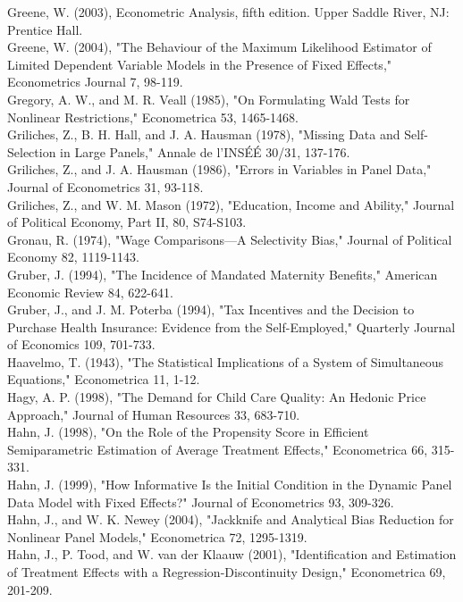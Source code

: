 \documentclass[10pt]{article}
\begin{document}
Greene, W. (2003), Econometric Analysis, fifth edition. Upper Saddle River, NJ: Prentice Hall.\\
Greene, W. (2004), "The Behaviour of the Maximum Likelihood Estimator of Limited Dependent Variable Models in the Presence of Fixed Effects," Econometrics Journal 7, 98-119.\\
Gregory, A. W., and M. R. Veall (1985), "On Formulating Wald Tests for Nonlinear Restrictions," Econometrica 53, 1465-1468.\\
Griliches, Z., B. H. Hall, and J. A. Hausman (1978), "Missing Data and Self-Selection in Large Panels," Annale de l'INSÉÉ 30/31, 137-176.\\
Griliches, Z., and J. A. Hausman (1986), "Errors in Variables in Panel Data," Journal of Econometrics 31, 93-118.\\
Griliches, Z., and W. M. Mason (1972), "Education, Income and Ability," Journal of Political Economy, Part II, 80, S74-S103.\\
Gronau, R. (1974), "Wage Comparisons—A Selectivity Bias," Journal of Political Economy 82, 1119-1143.\\
Gruber, J. (1994), "The Incidence of Mandated Maternity Benefits," American Economic Review 84, 622-641.\\
Gruber, J., and J. M. Poterba (1994), "Tax Incentives and the Decision to Purchase Health Insurance: Evidence from the Self-Employed," Quarterly Journal of Economics 109, 701-733.\\
Haavelmo, T. (1943), "The Statistical Implications of a System of Simultaneous Equations," Econometrica 11, 1-12.\\
Hagy, A. P. (1998), "The Demand for Child Care Quality: An Hedonic Price Approach," Journal of Human Resources 33, 683-710.\\
Hahn, J. (1998), "On the Role of the Propensity Score in Efficient Semiparametric Estimation of Average Treatment Effects," Econometrica 66, 315-331.\\
Hahn, J. (1999), "How Informative Is the Initial Condition in the Dynamic Panel Data Model with Fixed Effects?" Journal of Econometrics 93, 309-326.\\
Hahn, J., and W. K. Newey (2004), "Jackknife and Analytical Bias Reduction for Nonlinear Panel Models," Econometrica 72, 1295-1319.\\
Hahn, J., P. Tood, and W. van der Klaauw (2001), "Identification and Estimation of Treatment Effects with a Regression-Discontinuity Design," Econometrica 69, 201-209.
\end{document}

